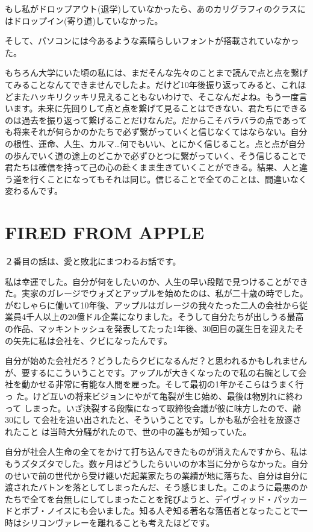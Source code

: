 \documentclass[a4paper,11pt,twocolumn]{jarticle}
\begin{document}
もし私がドロップアウト(退学)していなかったら、あのカリグラフィのクラスに
はドロップイン(寄り道)していなかった。

そして、パソコンには今あるような素晴らしいフォントが搭載されていなかった。

もちろん大学にいた頃の私には、まだそんな先々のことまで読んで点と点を繋げ
てみることなんてできませんでしたよ。だけど10年後振り返ってみると、これほ
どまたハッキリクッキリ見えることもないわけで、そこなんだよね。もう一度言
います。未来に先回りして点と点を繋げて見ることはできない、君たちにできる
のは過去を振り返って繋げることだけなんだ。だからこそバラバラの点であって
も将来それが何らかのかたちで必ず繋がっていくと信じなくてはならない。自分
の根性、運命、人生、カルマ…何でもいい、とにかく信じること。点と点が自分
の歩んでいく道の途上のどこかで必ずひとつに繋がっていく、そう信じることで
君たちは確信を持って己の心の赴くまま生きていくことができる。結果、人と違
う道を行くことになってもそれは同じ。信じることで全てのことは、間違いなく
変わるんです。

\section{FIRED FROM APPLE}

２番目の話は、愛と敗北にまつわるお話です。

私は幸運でした。自分が何をしたいのか、人生の早い段階で見つけることができ
た。実家のガレージでウォズとアップルを始めたのは、私が二十歳の時でした。
がむしゃらに働いて10年後、アップルはガレージの我々たった二人の会社から従
業員4千人以上の20億ドル企業になりました。そうして自分たちが出しうる最高
の作品、マッキントッシュを発表してたった1年後、30回目の誕生日を迎えたそ
の矢先に私は会社を、クビになったんです。

自分が始めた会社だろ？どうしたらクビになるんだ？と思われるかもしれません
が、要するにこういうことです。アップルが大きくなったので私の右腕として会
社を動かせる非常に有能な人間を雇った。そして最初の1年かそこらはうまく行っ
た。けど互いの将来ビジョンにやがて亀裂が生じ始め、最後は物別れに終わって
しまった。いざ決裂する段階になって取締役会議が彼に味方したので、齢30にし
て会社を追い出されたと、そういうことです。しかも私が会社を放逐されたこと
は当時大分騒がれたので、世の中の誰もが知っていた。

自分が社会人生命の全てをかけて打ち込んできたものが消えたんですから、私は
もうズタズタでした。数ヶ月はどうしたらいいのか本当に分からなかった。自分
のせいで前の世代から受け継いだ起業家たちの業績が地に落ちた、自分は自分に
渡されたバトンを落としてしまったんだ、そう感じました。このように最悪のか
たちで全てを台無しにしてしまったことを詫びようと、デイヴィッド・パッカー
ドとボブ・ノイスにも会いました。知る人ぞ知る著名な落伍者となったことで一
時はシリコンヴァレーを離れることも考えたほどです。 
\end{document}
